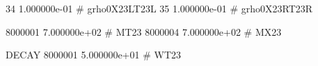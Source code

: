    34 1.000000e-01 # grho0X23LT23L 
   35 1.000000e-01 # grho0X23RT23R 

  8000001 7.000000e+02 # MT23 
  8000004 7.000000e+02 # MX23 
  
  DECAY 8000001 5.000000e+01 # WT23 
